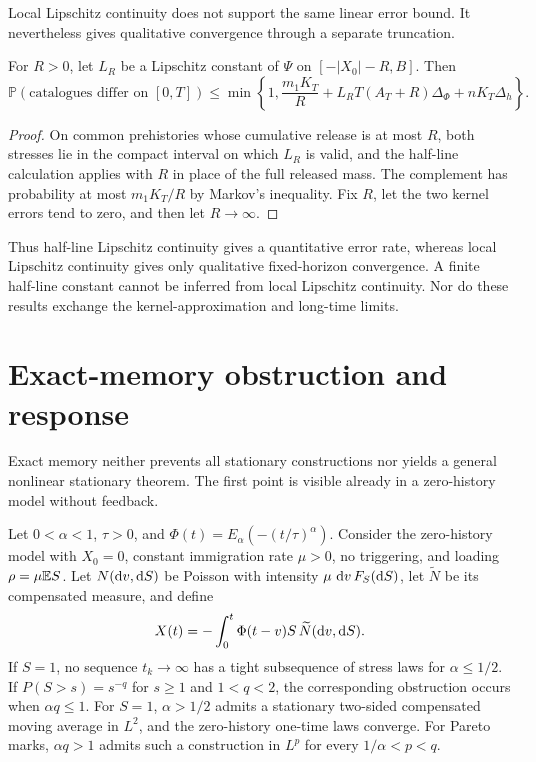 Local Lipschitz continuity does not support the same linear error bound. It nevertheless gives qualitative convergence through a separate truncation.

\begin{proposition}\label{prop:qualitative-kernel}
For \(R>0\), let \(L_R\) be a Lipschitz constant of \(\Psi\) on \([-|X_0|-R,B]\). Then
\begin{equation}\label{eq:qualitative-kernel}
\mathbb P(\text{catalogues differ on }[0,T])
\leq\min\left\{1,\frac{m_1K_T}{R}
+L_RT(A_T+R)\Delta_\Phi+nK_T\Delta_h\right\}.
\end{equation}
\end{proposition}

\begin{proof}
On common prehistories whose cumulative release is at most \(R\), both stresses lie in the compact interval on which \(L_R\) is valid, and the half-line calculation applies with \(R\) in place of the full released mass. The complement has probability at most \(m_1K_T/R\) by Markov's inequality. Fix \(R\), let the two kernel errors tend to zero, and then let \(R\to\infty\).
\end{proof}

Thus half-line Lipschitz continuity gives a quantitative error rate, whereas local Lipschitz continuity gives only qualitative fixed-horizon convergence. A finite half-line constant cannot be inferred from local Lipschitz continuity. Nor do these results exchange the kernel-approximation and long-time limits.

\section{Exact-memory obstruction and response}

Exact memory neither prevents all stationary constructions nor yields a general nonlinear stationary theorem. The first point is visible already in a zero-history model without feedback.

\begin{proposition}\label{prop:exact-obstruction}
Let \(0<\alpha<1\), \(\tau>0\), and
\(\Phi(t)=E_\alpha(-(t/\tau)^\alpha)\). Consider the zero-history model with \(X_0=0\), constant immigration rate \(\mu>0\), no triggering, and loading \(\rho=\mu\mathbb{E}  S\). Let \(N(\mathop{}\!\mathrm{d} v,\mathop{}\!\mathrm{d} S)\) be Poisson with intensity \(\mu\,\mathop{}\!\mathrm{d} v\,F_S(\mathop{}\!\mathrm{d} S)\), let \(\widetilde N\) be its compensated measure, and define
\[
X(t)=-\int_0^t\Phi(t-v)S\,\widetilde N(\mathop{}\!\mathrm{d} v,\mathop{}\!\mathrm{d} S).
\]
If \(S=1\), no sequence \(t_k\to\infty\) has a tight subsequence of stress laws for \(\alpha\leq1/2\). If \(P(S>s)=s^{-q}\) for \(s\geq1\) and \(1<q<2\), the corresponding obstruction occurs when \(\alpha q\leq1\). For \(S=1\), \(\alpha>1/2\) admits a stationary two-sided compensated moving average in \(L^2\), and the zero-history one-time laws converge. For Pareto marks, \(\alpha q>1\) admits such a construction in \(L^p\) for every \(1/\alpha<p<q\).
\end{proposition}

